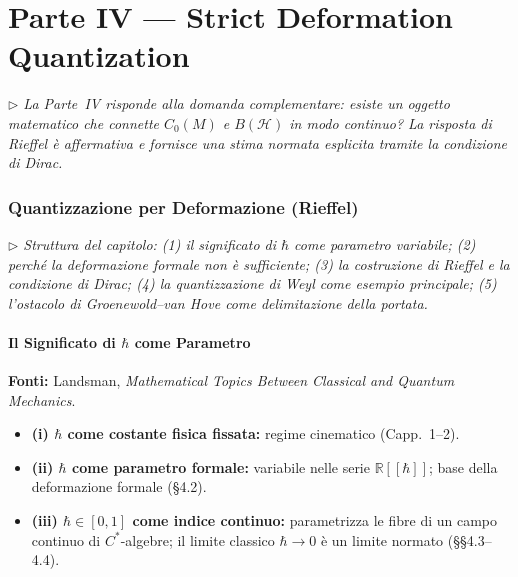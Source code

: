 \documentclass[12pt, a4paper]{article}
\newcommand{\fonti}[1]{%
	\begin{fontebox}
		\textcolor{fontecolor}{\footnotesize\textbf{Fonti:} #1}
	\end{fontebox}%
}
\newcommand{\nota}[1]{%
	\par\smallskip
	\noindent\textit{\small $\triangleright$\; #1}
	\par\smallskip
}
\begin{document}
	\newpage
	\part*{Parte IV --- Strict Deformation Quantization}
	
	\nota{La Parte~IV risponde alla domanda complementare: esiste un oggetto matematico
		che connette $C_0(M)$ e $B(\mathcal{H})$ in modo continuo? La risposta di Rieffel
		è affermativa e fornisce una stima normata esplicita tramite la condizione di Dirac.}
	
	\section{Quantizzazione per Deformazione (Rieffel)}
	
	\nota{Struttura del capitolo: (1) il significato di $\hbar$ come parametro variabile;
		(2) perché la deformazione formale non è sufficiente; (3) la costruzione di Rieffel
		e la condizione di Dirac; (4) la quantizzazione di Weyl come esempio principale;
		(5) l'ostacolo di Groenewold--van Hove come delimitazione della portata.}
	
	\subsection{Il Significato di $\hbar$ come Parametro}
	
	\fonti{Landsman, \textit{Mathematical Topics Between Classical and Quantum Mechanics}.}
	
	\begin{itemize}
		\item \textbf{(i) $\hbar$ come costante fisica fissata:} regime cinematico
		(Capp.\ 1--2).
		\item \textbf{(ii) $\hbar$ come parametro formale:} variabile nelle serie
		$\mathbb{R}[[\hbar]]$; base della deformazione formale (\S4.2).
		\item \textbf{(iii) $\hbar\in[0,1]$ come indice continuo:} parametrizza le fibre
		di un campo continuo di $C^*$-algebre; il limite classico $\hbar\to 0$ è un
		limite normato (\S\S4.3--4.4).
	\end{itemize}
	
\end{document}
